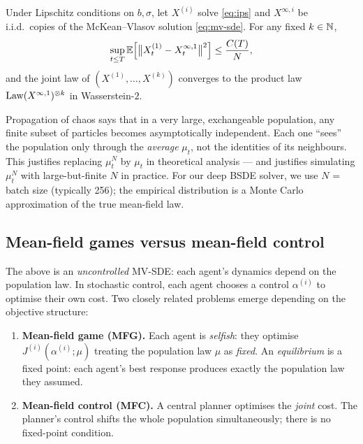 \begin{theorem}
\label{thm:poc}
Under Lipschitz conditions on $b, \sigma$, let $X^{(i)}$ solve \eqref{eq:ips} and $X^{\infty, i}$ be i.i.d.\ copies of the McKean--Vlasov solution \eqref{eq:mv-sde}. For any fixed $k \in \mathbb{N}$,
\begin{equation}
  \sup_{t \leq T} \mathbb{E}\Bigl[\bigl\|X^{(1)}_t - X^{\infty, 1}_t\bigr\|^2\Bigr] \leq \frac{C(T)}{N},
\end{equation}
and the joint law of $(X^{(1)}, \ldots, X^{(k)})$ converges to the product law $\mathrm{Law}(X^{\infty, 1})^{\otimes k}$ in Wasserstein-$2$.
\end{theorem}

\begin{intuition}
Propagation of chaos says that in a very large, exchangeable population, any finite subset of particles becomes asymptotically independent. Each one ``sees'' the population only through the \emph{average} $\mu_t$, not the identities of its neighbours. This justifies replacing $\mu^N_t$ by $\mu_t$ in theoretical analysis --- and justifies simulating $\mu^N_t$ with large-but-finite $N$ in practice. For our deep BSDE solver, we use $N$ = batch size (typically 256); the empirical distribution is a Monte Carlo approximation of the true mean-field law.
\end{intuition}

\subsection{Mean-field games versus mean-field control}

The above is an \emph{uncontrolled} MV-SDE: each agent's dynamics depend on the population law. In stochastic control, each agent chooses a control $\alpha^{(i)}$ to optimise their own cost. Two closely related problems emerge depending on the objective structure:

\begin{enumerate}[leftmargin=2em]
  \item \textbf{Mean-field game (MFG).}  Each agent is \emph{selfish}: they optimise $J^{(i)}(\alpha^{(i)}; \mu)$ treating the population law $\mu$ as \emph{fixed}. An \emph{equilibrium} is a fixed point: each agent's best response produces exactly the population law they assumed.
  \item \textbf{Mean-field control (MFC).}  A central planner optimises the \emph{joint} cost. The planner's control shifts the whole population simultaneously; there is no fixed-point condition.
\end{enumerate}

